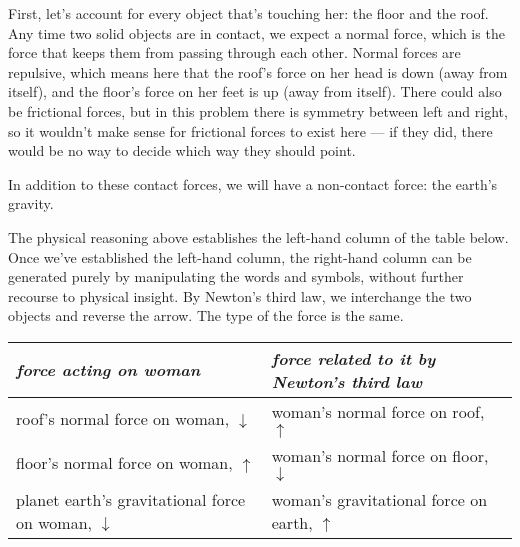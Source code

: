 First, let's account for every object that's touching her: the floor and the roof.
Any time two solid objects are in contact, we expect a normal force, which is the
force that keeps them from passing through each other. Normal forces are repulsive,
which means here that the roof's force on her head is down (away from itself),
and the floor's force on her feet is up (away from itself).
There could also be frictional
forces, but in this problem there is symmetry between left and right, so it wouldn't
make sense for frictional forces to exist here --- if they did, there would be no
way to decide which way they should point.

In addition to these contact forces, we will have a non-contact force: the earth's
gravity.

The physical reasoning above establishes the left-hand column of the table below.
Once we've established the left-hand column, the right-hand column can be generated
purely by manipulating the words and symbols, without further recourse to physical
insight. By Newton's third law, we interchange the two objects and reverse the arrow.
The type of the force is the same.

\begin{tabular}{|p{70mm}|p{70mm}|}
\hline
\emph{force acting on woman}  &   \emph{force related to it by Newton's third law} \\
\hline
roof's normal force on woman, $\downarrow$ & woman's normal force on roof, $\uparrow$\\
\hline
floor's normal force on woman, $\uparrow$ & woman's normal force on floor, $\downarrow$\\
\hline
planet earth's gravitational force on woman, $\downarrow$  &  woman's gravitational force on earth, $\uparrow$\\
\hline
\end{tabular}
